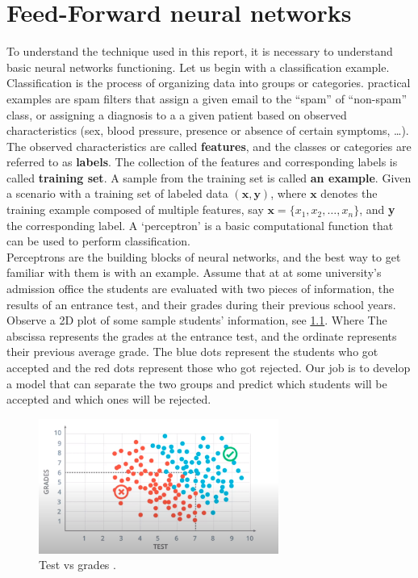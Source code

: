 \chapter{Feed-Forward neural networks}
To understand the technique used in this report, it is necessary to understand basic neural networks functioning. Let us begin with a classification example. Classification is the process of organizing data into groups or categories. practical examples are spam filters that assign a given email to the ``spam'' of ``non-spam'' class, or assigning a diagnosis to a a given patient based on observed characteristics (sex, blood pressure, presence or absence of certain symptoms, \ldots). The observed characteristics are called \textbf{features}, and the classes or categories are referred to as \textbf{labels}. The collection of the features and corresponding labels is called \textbf{training set}. A sample from the training set is called \textbf{an example}.
Given a scenario with a training set of labeled data $(\textbf{x}, \textbf{y})$, where $\textbf{x}$ denotes the training example composed of multiple features, say $\textbf{x} = \{x_{1}, x_{2}, \ldots, x_{n}\}$, and \textbf{y} the corresponding label.
A `perceptron' is a basic computational function that can be used to perform classification. \\
Perceptrons are the building blocks of neural networks, and the best way to get familiar with them is with an example. Assume that at at some university's admission office the students are evaluated with two pieces of information, the results of an entrance test, and their grades during their previous school years. Observe a 2D plot of some sample students' information, see \cref{fig:perceptron}. Where The abscissa represents the grades at the entrance test, and the ordinate represents their previous average grade. The blue dots represent the students who got accepted and the red dots represent those who got rejected. Our job is to develop a model that can separate the two groups and predict which students will be accepted and which ones will be rejected.

\begin{figure}[!htpb]
  \centering
  \includegraphics[width=0.7\textwidth]{figs/fig1.png}
  \caption{Test vs grades \cite{ud188}.}\label{fig:perceptron}
\end{figure}


